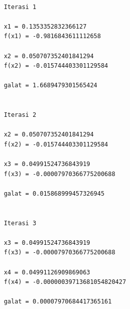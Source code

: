 \documentclass[12pt]{article}
\begin{document}
\begin{enumerate}
{\begin{lstlisting}
    
    Iterasi 1
    
    x1 = 0.1353352832366127
    f(x1) = -0.9816843611112658
    
    x2 = 0.050707352401841294
    f(x2) = -0.015744403301129584
    
    galat = 1.6689479301565424
    
    
    Iterasi 2
    
    x2 = 0.050707352401841294
    f(x2) = -0.015744403301129584
    
    x3 = 0.04991524736843919
    f(x3) = -0.00007970366775200688
    
    galat = 0.015868999457326945
    
    
    Iterasi 3
    
    x3 = 0.04991524736843919
    f(x3) = -0.00007970366775200688
    
    x4 = 0.04991126909869063
    f(x4) = -0.00000039713681054820427
    
    galat = 0.00007970684417365161
    

\end{lstlisting}}
\end{enumerate}
\end{document}
